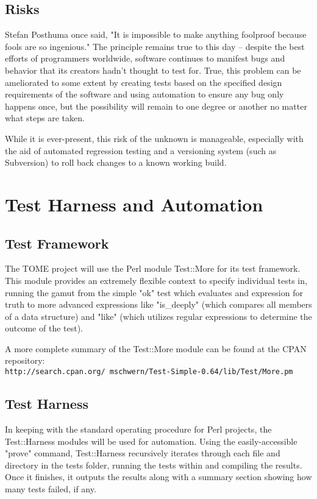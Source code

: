 \documentclass[12pt,titlepage]{article}
\begin{document}
\subsection{Risks}
Stefan Posthuma once said, "It is impossible to make anything foolproof because fools are so ingenious."  The principle remains true to this day -- despite the best efforts of programmers worldwide, software continues to manifest bugs and behavior that its creators hadn't thought to test for.  True, this problem can be ameliorated to some extent by creating tests based on the specified design requirements of the software and using automation to ensure any bug only happens once, but the possibility will remain to one degree or another no matter what steps are taken.

While it is ever-present, this risk of the unknown is manageable, especially with the aid of automated regression testing and a versioning system (such as Subversion) to roll back changes to a known working build.

\section{Test Harness and Automation}
\subsection{Test Framework}
The TOME project will use the Perl module Test::More for its test framework.  This module provides an extremely flexible context to specify individual tests in, running the gamut from the simple "ok" test which evaluates and expression for truth to more advanced expressions like "is\_deeply" (which compares all members of a data structure) and "like" (which utilizes regular expressions to determine the outcome of the test).

A more complete summary of the Test::More module can be found at the CPAN repository: \\
\texttt{http://search.cpan.org/~mschwern/Test-Simple-0.64/lib/Test/More.pm}

\subsection{Test Harness}
In keeping with the standard operating procedure for Perl projects, the Test::Harness modules will be used for automation.  Using the easily-accessible "prove" command, Test::Harness recursively iterates through each file and directory in the tests folder, running the tests within and compiling the results.  Once it finishes, it outputs the results along with a summary section showing how many tests failed, if any.
\end{document}
